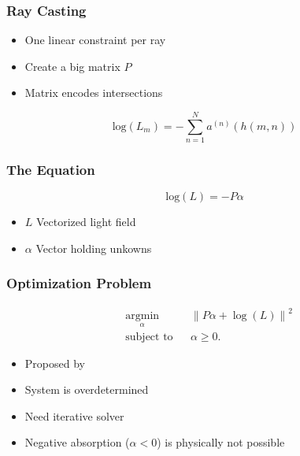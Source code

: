 \documentclass[12pt, compress]{beamer}
\begin{document}
\begin{frame}[fragile]
	\frametitle{Ray Casting}
	
	\begin{itemize}[<alert@+>]
		\item One linear constraint per ray
		\item Create a big matrix $P$
		\item Matrix encodes intersections
	\end{itemize}
	\vspace{2cm}
	\begin{equation*}
			\text{log}(L_m) = -\sum_{n=1}^{N} a^{(n)} (h(m, n)) 
	\end{equation*}
	
\end{frame}

\begin{frame}[fragile]
	\frametitle{The Equation}
	
	{\LARGE
		\begin{equation*}
			\text{log}(L) = - P \alpha
		\end{equation*}
	}
	\begin{itemize} %
		\item $L$ Vectorized light field
		\item $\alpha$ Vector holding unkowns
	\end{itemize}
\end{frame}

\begin{frame}[fragile]
	\frametitle{Optimization Problem}
	
	\begin{equation*}
		\begin{aligned}
			& \underset{\alpha}{\text{argmin}} 	& & \left\lVert P \alpha + \log(L) \right\rVert ^2 \\
			& \text{subject to} 				& & \alpha \geq 0.
		\end{aligned}
	\end{equation*}
	
	\begin{itemize}
		\item Proposed by \cite{WetzsteinTomo}
		\item System is overdetermined
		\item Need iterative solver
		\item Negative absorption ($\alpha < 0$) is physically not possible
	\end{itemize}
\end{frame}
\end{document}
